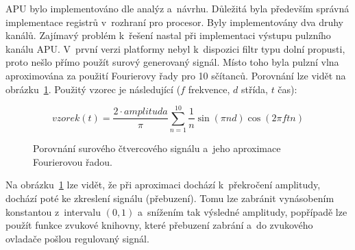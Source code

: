 APU bylo implementováno dle analýz a~návrhu. Důležitá byla především správná implementace registrů v~rozhraní pro procesor. Byly implementovány dva druhy kanálů. Zajímavý problém k~řešení nastal při implementaci výstupu pulzního kanálu APU. V~první verzi platformy nebyl k~dispozici filtr typu dolní propusti, proto nešlo přímo použít surový generovaný signál. Místo toho byla pulzní vlna aproximována za použití Fourierovy řady pro 10 sčítanců. Porovnání lze vidět na obrázku~\ref{fig:impl-fourier}. Použitý vzorec je následující ($f$ frekvence, $d$ střída, $t$ čas):

\[
vzorek(t) = \frac{2 \cdot amplituda}{\pi}\sum_{n = 1}^{10}{\frac{1}{n}\sin(\pi n d)\cos(2 \pi f t n)}
\]

\begin{figure}[ht!]
	\centering
	\caption{Porovnání surového čtvercového signálu a~jeho aproximace Fourierovou řadou.}\label{fig:impl-fourier}
\end{figure}

\begin{note}
	Na obrázku~\ref{fig:impl-fourier} lze vidět, že při aproximaci dochází k~překročení amplitudy, dochází poté ke zkreslení signálu (přebuzení). Tomu lze zabránit vynásobením konstantou z~intervalu $(0,1)$ a~snížením tak výsledné amplitudy, popřípadě lze použít funkce zvukové knihovny, které přebuzení zabrání a~do zvukového ovladače pošlou regulovaný signál.
\end{note}

